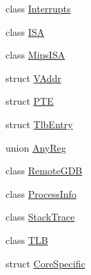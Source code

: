 \begin{DoxyCompactItemize}
class \hyperlink{classMipsISA_1_1Interrupts}{Interrupts}
\item 
class \hyperlink{classMipsISA_1_1ISA}{ISA}
\item 
class \hyperlink{classMipsISA_1_1MipsISA}{MipsISA}
\item 
struct \hyperlink{structMipsISA_1_1VAddr}{VAddr}
\item 
struct \hyperlink{structMipsISA_1_1PTE}{PTE}
\item 
struct \hyperlink{structMipsISA_1_1TlbEntry}{TlbEntry}
\item 
union \hyperlink{unionMipsISA_1_1AnyReg}{AnyReg}
\item 
class \hyperlink{classMipsISA_1_1RemoteGDB}{RemoteGDB}
\item 
class \hyperlink{classMipsISA_1_1ProcessInfo}{ProcessInfo}
\item 
class \hyperlink{classMipsISA_1_1StackTrace}{StackTrace}
\item 
class \hyperlink{classMipsISA_1_1TLB}{TLB}
\item 
struct \hyperlink{structMipsISA_1_1CoreSpecific}{CoreSpecific}
\end{DoxyCompactItemize}
